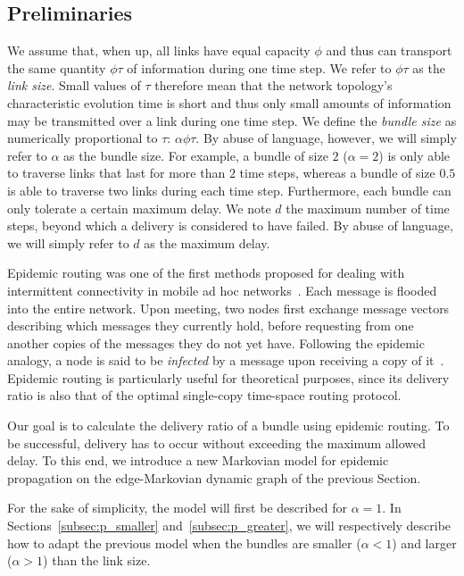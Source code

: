 \documentclass[final,journal,letterpaper]{IEEEtran}
\begin{document}
\subsection{Preliminaries}
\label{subsec:preliminaries}

We assume that, when up, all links have equal capacity $\phi$ and thus can transport the same quantity $\phi \tau$ of information during one time step. We refer to $\phi \tau$ as the \emph{link size}. Small values of $\tau$ therefore mean that the network topology's characteristic evolution time is short and thus only small amounts of information may be transmitted over a link during one time step. We define the \textit{bundle size} as numerically proportional to $\tau$: $\alpha \phi \tau$. By abuse of language, however, we will simply refer to $\alpha$ as the bundle size. For example, a bundle of size $2$ ($\alpha=2$) is only able to traverse links that last for more than $2$ time steps, whereas a bundle of size $0.5$ is able to traverse two links during each time step.  Furthermore, each bundle can only tolerate a certain maximum delay. We note $d$ the maximum number of time steps, beyond which a delivery is considered to have failed. By abuse of language, we will simply refer to $d$ as the maximum delay.

Epidemic routing was one of the first methods proposed for dealing with intermittent connectivity in mobile ad hoc networks~\cite{Vahdat00epidemicrouting}. Each message is flooded into the entire network. Upon meeting, two nodes first exchange message vectors describing which messages they currently hold, before requesting from one another copies of the messages they do not yet have. Following the epidemic analogy, a node is said to be \textit{infected} by a message upon receiving a copy of it~\cite{Zhang20072867}. Epidemic routing is particularly useful for theoretical purposes, since its delivery ratio is also that of the optimal single-copy time-space routing protocol.

Our goal is to calculate the delivery ratio of a bundle using epidemic routing. To be successful, delivery has to occur without exceeding the maximum allowed delay. To this end, we introduce a new Markovian model for epidemic propagation on the edge-Markovian dynamic graph of the previous Section.

For the sake of simplicity, the model will first be described for $\alpha = 1$. In Sections~\ref{subsec:p_smaller} and~\ref{subsec:p_greater}, we will respectively describe how to adapt the previous model when the bundles are smaller ($\alpha < 1$) and larger ($\alpha > 1$) than the link size.
\end{document}
